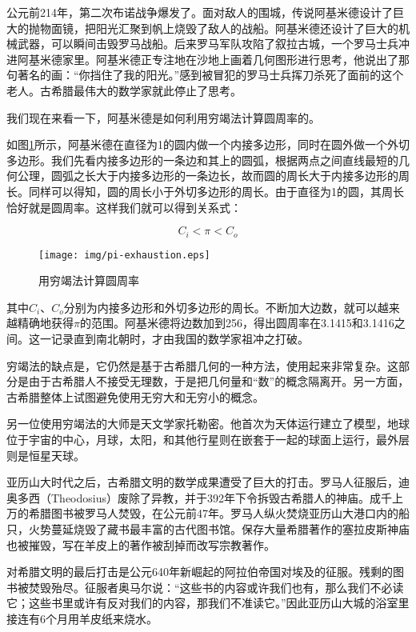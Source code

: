 \documentclass{article}
\begin{document}
公元前214年，第二次布诺战争爆发了。面对敌人的围城，传说阿基米德设计了巨大的抛物面镜，把阳光汇聚到帆上烧毁了敌人的战船。阿基米德还设计了巨大的机械武器，可以瞬间击毁罗马战船。后来罗马军队攻陷了叙拉古城，一个罗马士兵冲进阿基米德家里。阿基米德正专注地在沙地上画着几何图形进行思考，他说出了那句著名的画：“你挡住了我的阳光。”感到被冒犯的罗马士兵挥刀杀死了面前的这个老人。古希腊最伟大的数学家就此停止了思考。

我们现在来看一下，阿基米德是如何利用穷竭法计算圆周率的。

如图\ref{fig:pi-exhaustion}所示，阿基米德在直径为1的圆内做一个内接多边形，同时在圆外做一个外切多边形。我们先看内接多边形的一条边和其上的圆弧，根据两点之间直线最短的几何公理，圆弧之长大于内接多边形的一条边长，故而圆的周长大于内接多边形的周长。同样可以得知，圆的周长小于外切多边形的周长。由于直径为1的圆，其周长恰好就是圆周率。这样我们就可以得到关系式：

\[
  C_i < \pi < C_o
\]

\begin{figure}[htbp]
 \centering
 \texttt{[image: img/pi-exhaustion.eps]}
 \caption{用穷竭法计算圆周率}
 \label{fig:pi-exhaustion}
\end{figure}

其中$C_i$、$C_o$分别为内接多边形和外切多边形的周长。不断加大边数，就可以越来越精确地获得$\pi$的范围。阿基米德将边数加到256，得出圆周率在3.1415和3.1416之间。这一记录直到南北朝时，才由我国的数学家祖冲之打破。

穷竭法的缺点是，它仍然是基于古希腊几何的一种方法，使用起来非常复杂。这部分是由于古希腊人不接受无理数，于是把几何量和“数”的概念隔离开。另一方面，古希腊整体上试图避免使用无穷大和无穷小的概念。

另一位使用穷竭法的大师是天文学家托勒密。他首次为天体运行建立了模型，地球位于宇宙的中心，月球，太阳，和其他行星则在嵌套于一起的球面上运行，最外层则是恒星天球。

亚历山大时代之后，古希腊文明的数学成果遭受了巨大的打击。罗马人征服后，迪奥多西（Theodosius）废除了异教，并于392年下令拆毁古希腊人的神庙。成千上万的希腊图书被罗马人焚毁，在公元前47年。罗马人纵火焚烧亚历山大港口内的船只，火势蔓延烧毁了藏书最丰富的古代图书馆。保存大量希腊著作的塞拉皮斯神庙也被摧毁，写在羊皮上的著作被刮掉而改写宗教著作。

对希腊文明的最后打击是公元640年新崛起的阿拉伯帝国对埃及的征服。残剩的图书被焚毁殆尽。征服者奥马尔说：“这些书的内容或许我们也有，那么我们不必读它；这些书里或许有反对我们的内容，那我们不准读它。”因此亚历山大城的浴室里接连有6个月用羊皮纸来烧水\cite{M-Kline-2007}。
\end{document}
